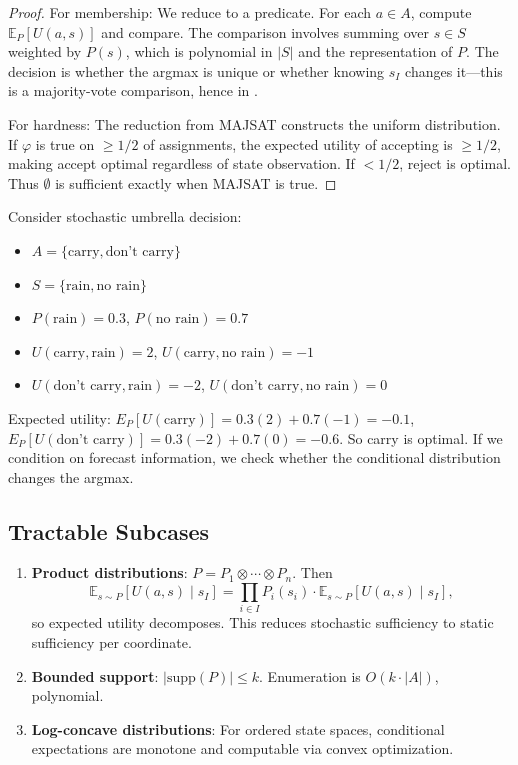 
\begin{proof}
For membership: We reduce to a \PP predicate. For each $a \in A$, compute $\mathbb{E}_P[U(a,s)]$ and compare. The comparison involves summing over $s \in S$ weighted by $P(s)$, which is polynomial in $|S|$ and the representation of $P$. The decision is whether the argmax is unique or whether knowing $s_I$ changes it---this is a majority-vote comparison, hence in \PP.

For hardness: The reduction from MAJSAT constructs the uniform distribution. If $\varphi$ is true on $\geq 1/2$ of assignments, the expected utility of accepting is $\geq 1/2$, making accept optimal regardless of state observation. If $< 1/2$, reject is optimal. Thus $\emptyset$ is sufficient exactly when MAJSAT is true.
\end{proof}

\begin{example}
Consider stochastic umbrella decision:
\begin{itemize}
\item $A = \{\text{carry}, \text{don't carry}\}$
\item $S = \{\text{rain}, \text{no rain}\}$
\item $P(\text{rain}) = 0.3$, $P(\text{no rain}) = 0.7$
\item $U(\text{carry}, \text{rain}) = 2$, $U(\text{carry}, \text{no rain}) = -1$
\item $U(\text{don't carry}, \text{rain}) = -2$, $U(\text{don't carry}, \text{no rain}) = 0$
\end{itemize}
Expected utility: $E_P[U(\text{carry})] = 0.3(2) + 0.7(-1) = -0.1$, $E_P[U(\text{don't carry})] = 0.3(-2) + 0.7(0) = -0.6$. So carry is optimal. If we condition on forecast information, we check whether the conditional distribution changes the argmax.
\end{example}

\subsection{Tractable Subcases}

\begin{enumerate}
\item \textbf{Product distributions}: $P = P_1 \otimes \cdots \otimes P_n$. Then
\[
\mathbb{E}_{s \sim P}[U(a,s) \mid s_I] = \prod_{i \in I} P_i(s_i) \cdot \mathbb{E}_{s \sim P}[U(a,s) \mid s_I],
\]
so expected utility decomposes. This reduces stochastic sufficiency to static sufficiency per coordinate.

\item \textbf{Bounded support}: $|\text{supp}(P)| \leq k$. Enumeration is $O(k \cdot |A|)$, polynomial.

\item \textbf{Log-concave distributions}: For ordered state spaces, conditional expectations are monotone and computable via convex optimization.
\end{enumerate}

